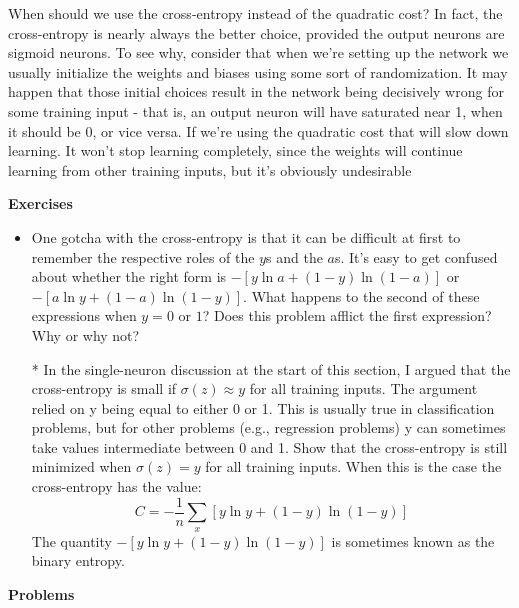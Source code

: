When should we use the cross-entropy instead of the quadratic cost? In fact, the cross-entropy is nearly always the better choice, provided the output neurons are sigmoid neurons. To see why, consider that when we're setting up the network we usually initialize the weights and biases using some sort of randomization. It may happen that those initial choices result in the network being decisively wrong for some training input - that is, an output neuron will have saturated near 1, when it should be 0, or vice versa. If we're using the quadratic cost that will slow down learning. It won't stop learning completely, since the weights will continue learning from other training inputs, but it's obviously undesirable


\textbf{Exercises}
\begin{itemize}
\item One gotcha with the cross-entropy is that it can be difficult at first to remember the respective roles of the $y$s and the $a$s. It's easy to get confused about whether the right form is $-[y \ln a+(1-y) \ln (1-a)]$ or $-[a \ln y+(1-a) \ln (1-y)]$. What happens to the second of these expressions when $y=0$ or $1$? Does this problem afflict the first expression? Why or why not? 

*  In the single-neuron discussion at the start of this section, I argued that the cross-entropy is small if $\sigma(z) \approx y$ for all training inputs. The argument relied on y being equal to either 0 or 1. This is usually true in classification problems, but for other problems (e.g., regression problems) y can sometimes take values intermediate between 0 and 1. Show that the cross-entropy is still minimized when $\sigma(z)=y$ for all training inputs. When this is the case the cross-entropy has the value: 
\begin{equation}
C=-\frac{1}{n} \sum_{x}[y \ln y+(1-y) \ln (1-y)]
\label{eq:c03-64}
\end{equation}
The quantity $-[y \ln y+(1-y) \ln (1-y)]$ is sometimes known as the binary entropy.

\end{itemize}

\textbf{Problems}

